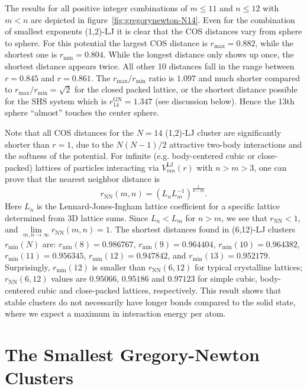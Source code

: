 The results for all positive integer combinations of $m\leq11$ and $n\leq12$
with $m<n$ are depicted in figure~\ref{fig:gregorynewton-N14}. Even for the
combination of smallest exponents (1,2)-\ac{LJ} it is clear that the \ac{COS}
distances vary from sphere to sphere. For this potential the largest \ac{COS}
distance is $r_\text{max}=0.882$, while the shortest one is
$r_\text{min}=0.804$. While the longest distance only shows up once, the
shortest distance appears twice. All other 10 distances fall in the range
between $r = 0.845$ and $r = 0.861$. The $r_\text{max} /r_\text{min}$ ratio is
$1.097$ and much shorter compared to $r_\text{max} /r_\text{min}= \sqrt{2}$ for
the closed packed lattice, or the shortest distance possible for the \ac{SHS}
system which is $r_{14}^\text{GN} = 1.347$ (see discussion below). Hence the
13th sphere ``almost'' touches the center sphere.

Note that all \ac{COS} distances for the $N=14$ (1,2)-\ac{LJ} cluster are
significantly shorter than $r=1$, due to the $N(N-1)/2$ attractive two-body
interactions and the softness of the potential.  For infinite (e.g.
body-centered cubic or close-packed) lattices of particles interacting via
$V^\mathrm{LJ}_{mn}(r)$ with $n> m >3$, one can prove
\autocite{Schwerdtfeger_ExtensionLennardJonespotential_2006} that the nearest neighbor distance is
%
\begin{equation}
    r_\mathrm{NN}(m,n)=\left( L_n L_m^{-1}\right)^\frac{1}{n-m}. %
    \label{eqn:lattice}
\end{equation}%
%
Here $L_n$ is the Lennard-Jones-Ingham lattice coefficient for a specific
lattice determined from 3D lattice sums.  Since $L_n<L_m$ for $n>m$, we see
that $r_\mathrm{NN}<1$, and $\lim\limits_{m,n\rightarrow
\infty}r_\mathrm{NN}(m,n)=1$.  The shortest distances found in (6,12)-\ac{LJ}
clusters $r_\text{min}(N)$ are: $r_\text{min}(8)=0.986767$,
$r_\text{min}(9)=0.964404$, $r_\text{min}(10)=0.964382$,
$r_\text{min}(11)=0.956345$, $r_\text{min}(12)=0.947842$, and
$r_\text{min}(13)=0.952179$.  Surprisingly, $r_\text{min}(12)$ is smaller than
$r_\mathrm{NN}(6,12)$ for typical crystalline lattices; $r_\mathrm{NN}(6,12)$
values are $0.95066$, $0.95186$ and $0.97123$ for simple cubic, body-centered
cubic and close-packed lattices, respectively.  This result shows that stable
clusters do not necessarily have longer bonds compared to the solid state,
where we expect a maximum in interaction energy per atom.


\section{The Smallest Gregory-Newton Clusters}
\label{sec:themsmallestgregorynewtonclusters}


